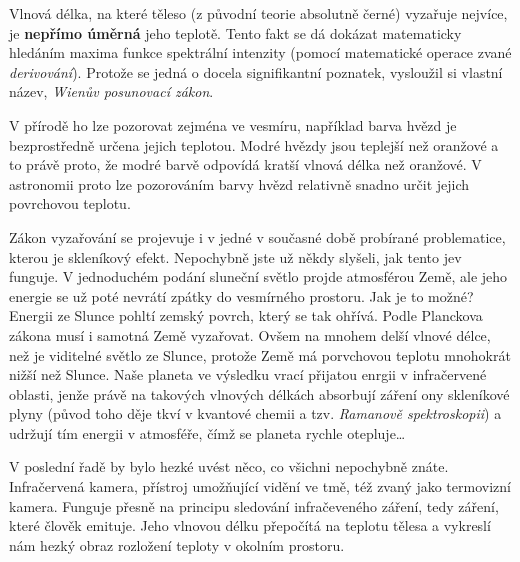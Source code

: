 \documentclass{../../../../style/mkimain}
\begin{document}
\noindent{}
\proborigin{}
\klein

Vlnová délka, na které těleso (z původní teorie absolutně černé) vyzařuje nejvíce, je \textbf{nepřímo úměrná} jeho teplotě.
Tento fakt se dá dokázat matematicky hledáním maxima funkce spektrální intenzity (pomocí matematické operace zvané \emph{derivování}).
Protože se jedná o docela signifikantní poznatek, vysloužil si vlastní název, \emph{Wienův posunovací zákon}.

V přírodě ho lze pozorovat zejména ve vesmíru, například barva hvězd je bezprostředně určena jejich teplotou.
Modré hvězdy jsou teplejší než oranžové a to právě proto, že modré barvě odpovídá kratší vlnová délka než oranžové.
V astronomii proto lze pozorováním barvy hvězd relativně snadno určit jejich povrchovou teplotu.


Zákon vyzařování se projevuje i v jedné v současné době probírané problematice, kterou je skleníkový efekt.
Nepochybně jste už někdy slyšeli, jak tento jev funguje. V jednoduchém podání sluneční světlo projde atmosférou Země,
ale jeho energie se už poté nevrátí zpátky do vesmírného prostoru. Jak je to možné? Energii ze Slunce pohltí zemský povrch, který se tak ohřívá.
Podle Planckova zákona musí i samotná Země vyzařovat. Ovšem na mnohem delší vlnové délce, než je viditelné světlo ze Slunce,
protože Země má porvchovou teplotu mnohokrát nižší než Slunce. Naše planeta ve výsledku vrací přijatou enrgii v infračervené oblasti,
jenže právě na takových vlnových délkách absorbují záření ony skleníkové plyny
(původ toho děje tkví v kvantové chemii a tzv. \emph{Ramanově spektroskopii}) a udržují tím energii v atmosféře,
čímž se planeta rychle otepluje\dots

V poslední řadě by bylo hezké uvést něco, co všichni nepochybně znáte. Infračervená kamera, přístroj umožňující vidění ve tmě,
též zvaný jako termovizní kamera. Funguje přesně na principu sledování infračeveného záření, tedy záření, které člověk emituje.
Jeho vlnovou délku přepočítá na teplotu tělesa a vykreslí nám hezký obraz rozložení teploty v okolním prostoru.
\end{document}
